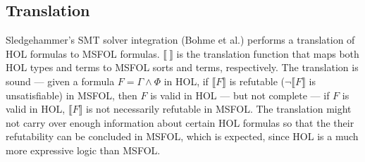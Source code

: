 \documentclass{article}
\begin{document}
	\subsection{Translation}
	\label{sec:trans}
	Sledgehammer's SMT solver 
	integration (Bohme et al.) performs 
	a translation 
	of HOL formulas to MSFOL formulas.
	$\llbracket\ \rrbracket$
	is the translation function 
	that maps both HOL types and 
	terms to MSFOL sorts and terms,
	respectively.
	The translation is sound --- 
	given a formula 
	$F = \Gamma \land \Phi$ in HOL, if 
	$\llbracket F \rrbracket$ is refutable 
	($\neg \llbracket F \rrbracket$
	is unsatisfiable) in MSFOL, then 
	$F$	is valid in HOL --- but not 
	complete --- if $F$ is valid in 
	HOL, $\llbracket F \rrbracket$ is 
	not necessarily refutable in MSFOL. 
	The translation might not carry over 
	enough information about certain HOL 
	formulas so that the their 
	refutability can be concluded in 
	MSFOL, which is	expected, since HOL 
	is a much more expressive logic than 
	MSFOL. 
	
\end{document}
